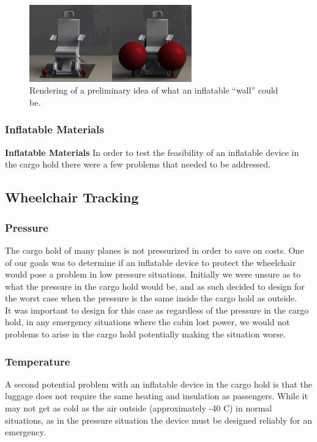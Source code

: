\begin{figure}[h]
  \centering
     \includegraphics[width=7cm]{images/inflatablesrendering.png}
   \caption{Rendering of a preliminary idea of what an inflatable ``wall'' could be.}
  \label{fig:inflatablesrendering.png}
\end{figure}

\subsubsection{Inflatable Materials}

\textbf{Inflatable Materials}
In order to test the feasibility of an inflatable device in the cargo hold there were a few problems that needed to be addressed. 

\subsection{Wheelchair Tracking}

\subsubsection{Pressure}
The cargo hold of many planes is not pressurized in order to save on costs. One of our goals was to determine if an inflatable device to protect the wheelchair would pose a problem in low pressure situations. Initially we were unsure as to what the pressure in the cargo hold would be, and as such decided to design for the worst case when the pressure is the same inside the cargo hold as outside. \\

It was important to design for this case as regardless of the pressure in the cargo hold, in any emergency situations where the cabin lost power, we would not problems to arise in the cargo hold potentially making the situation worse.

\subsubsection{Temperature}
A second potential problem with an inflatable device in the cargo hold is that the luggage does not require the same heating and insulation as passengers. While it may not get as cold as the air outside (approximately -40 C) in normal situations, as in the pressure situation the device must be designed reliably for an emergency. \\

